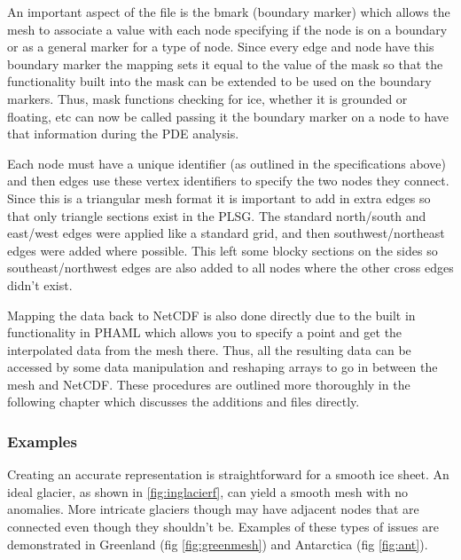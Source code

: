 An important aspect of the file is the bmark (boundary marker) which allows the mesh to associate a value with each node specifying if the node is on a boundary or as a general marker for a type of node.  Since every edge and node have this boundary marker the mapping sets it equal to the value of the mask so that the functionality built into the mask can be extended to be used on the boundary markers.  Thus, mask functions checking for ice, whether it is grounded or floating, etc can now be called passing it the boundary marker on a node to have that information during the PDE analysis.

Each node must have a unique identifier (as outlined in the specifications above) and then edges use these vertex identifiers to specify the two nodes they connect.  Since this is a triangular mesh format it is important to add in extra edges so that only triangle sections exist in the PLSG.  The standard north/south and east/west edges were applied like a standard grid, and then southwest/northeast edges were added where possible.  This left some blocky sections on the sides so southeast/northwest edges are also added to all nodes where the other cross edges didn't exist. 

Mapping the data back to NetCDF is also done directly due to the built in functionality in PHAML which allows you to specify a point and get the interpolated data from the mesh there.  Thus, all the resulting data can be accessed by some data manipulation and reshaping arrays to go in between the mesh and NetCDF.  These procedures are outlined more thoroughly in the following chapter which discusses the additions and files directly. 

\subsubsection{Examples}

Creating an accurate representation is straightforward for a smooth ice sheet.  An ideal glacier, as shown in \ref{fig:inglacierf}, can yield a smooth mesh with no anomalies.  More intricate glaciers though may have adjacent nodes that are connected even though they shouldn't be.  Examples of these types of issues are demonstrated in Greenland (fig \ref{fig:greenmesh}) and Antarctica (fig \ref{fig:ant}). 


